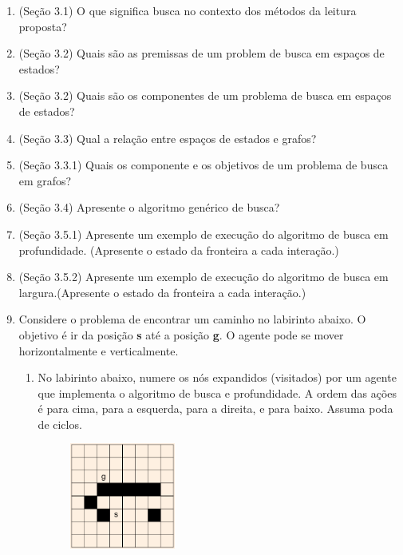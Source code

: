 \documentclass{article}
\begin{document}
\begin{enumerate}
    \item (Seção 3.1) O que significa busca no contexto dos métodos da leitura proposta?
    \item (Seção 3.2) Quais são as premissas de um problem de busca em espaços de estados?
    \item (Seção 3.2) Quais são os componentes de um problema de busca em espaços de estados?
    \item (Seção 3.3) Qual a relação entre espaços de estados e grafos?
    \item (Seção 3.3.1) Quais os componente e os objetivos de um problema de busca em grafos?
    \item (Seção 3.4) Apresente o algoritmo genérico de busca?
    \item (Seção 3.5.1) Apresente um exemplo de execução do algoritmo de busca em profundidade. (Apresente o estado da fronteira a cada interação.)
    \item (Seção 3.5.2) Apresente um exemplo de execução do algoritmo de busca em largura.(Apresente o estado da fronteira a cada interação.)
 

        \item Considere o problema de encontrar um caminho no labirinto abaixo. O objetivo é ir da posição \textbf{s} até a posição \textbf{g}. O agente pode se mover horizontalmente e verticalmente. 
            
        \begin{enumerate}
            
            \item No labirinto abaixo, numere os nós expandidos (visitados) por um agente que implementa o algoritmo de busca e profundidade. A ordem das ações é para cima, para a esquerda, para a direita, e para baixo. Assuma poda de ciclos.
            \begin{figure}[!ht]
                \centering
                \includegraphics[width=0.35\textwidth]{grid.png}
            \end{figure}
        

\end{enumerate}
\end{enumerate}
\end{document}
